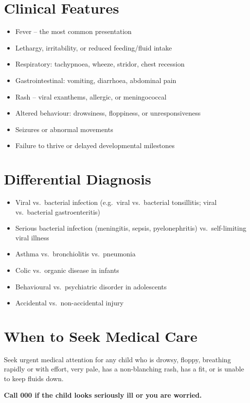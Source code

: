\section*{Clinical Features}
\begin{itemize}
    \item Fever -- the most common presentation
    \item Lethargy, irritability, or reduced feeding/fluid intake
    \item Respiratory: tachypnoea, wheeze, stridor, chest recession
    \item Gastrointestinal: vomiting, diarrhoea, abdominal pain
    \item Rash -- viral exanthems, allergic, or meningococcal
    \item Altered behaviour: drowsiness, floppiness, or unresponsiveness
    \item Seizures or abnormal movements
    \item Failure to thrive or delayed developmental milestones
\end{itemize}

\section*{Differential Diagnosis}
\begin{itemize}
    \item Viral vs.\ bacterial infection (e.g.\ viral vs.\ bacterial tonsillitis; viral vs.\ bacterial gastroenteritis)
    \item Serious bacterial infection (meningitis, sepsis, pyelonephritis) vs.\ self-limiting viral illness
    \item Asthma vs.\ bronchiolitis vs.\ pneumonia
    \item Colic vs.\ organic disease in infants
    \item Behavioural vs.\ psychiatric disorder in adolescents
    \item Accidental vs.\ non-accidental injury
\end{itemize}

\section*{When to Seek Medical Care}
Seek urgent medical attention for any child who is drowsy, floppy, breathing rapidly or with effort, very pale, has a non-blanching rash, has a fit, or is unable to keep fluids down.

\textbf{Call 000 if the child looks seriously ill or you are worried.}

